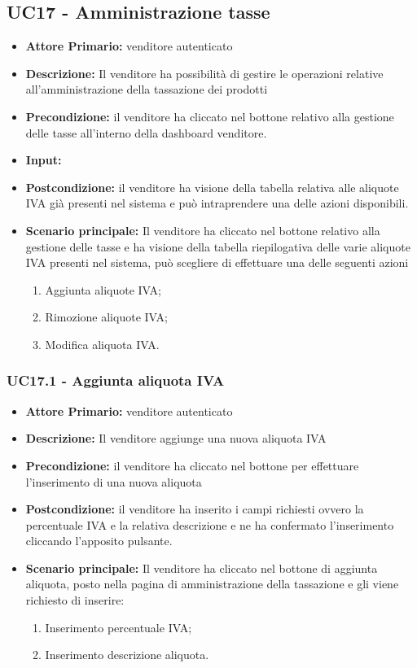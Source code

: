 \subsection{UC17 - Amministrazione tasse}
\begin{itemize}
    \item \textbf{Attore Primario:} venditore autenticato
    \item \textbf{Descrizione:} Il venditore ha possibilità di gestire le operazioni relative all’amministrazione della tassazione dei prodotti 
    \item \textbf{Precondizione:} il venditore ha cliccato nel bottone relativo alla gestione delle tasse all’interno della dashboard venditore.
    \item \textbf{Input:}
    \item \textbf{Postcondizione:} il venditore ha visione della tabella relativa alle aliquote IVA già presenti nel sistema e può intraprendere una delle azioni disponibili.
    \item \textbf{Scenario principale:} Il venditore ha cliccato nel bottone relativo alla gestione delle tasse e ha visione della tabella riepilogativa delle varie aliquote IVA presenti nel sistema, può scegliere di effettuare una delle seguenti azioni 
    \begin{enumerate}
        \item Aggiunta aliquote IVA;
        \item Rimozione aliquote IVA;
        \item Modifica aliquota IVA.
    \end{enumerate}
\end{itemize}


\subsubsection{UC17.1 - Aggiunta aliquota IVA}
\begin{itemize}
    \item \textbf{Attore Primario:}  venditore autenticato
    \item \textbf{Descrizione:} Il venditore aggiunge una nuova aliquota IVA  
    \item \textbf{Precondizione:} il venditore ha cliccato nel bottone per effettuare l’inserimento di una nuova aliquota
    \item \textbf{Postcondizione:} il venditore ha inserito i campi richiesti ovvero la percentuale IVA e la relativa descrizione e ne ha confermato l’inserimento cliccando l’apposito pulsante.
    \item \textbf{Scenario principale:} Il venditore ha cliccato nel bottone di aggiunta aliquota, posto nella pagina di amministrazione della tassazione e gli viene richiesto di inserire:
    \begin{enumerate}
        \item Inserimento percentuale IVA;
        \item Inserimento descrizione aliquota.
    \end{enumerate}
\end{itemize}


